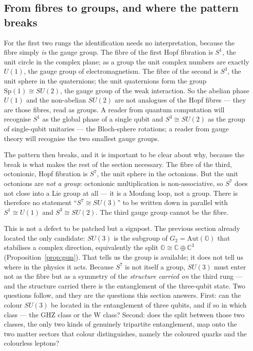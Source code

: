 \subsection{From fibres to groups, and where the pattern breaks}

For the first two rungs the identification needs no interpretation, because the fibre simply
\emph{is} the gauge group. The fibre of the first Hopf fibration is $S^1$, the unit circle in the
complex plane; as a group the unit complex numbers are exactly $U(1)$, the gauge group of
electromagnetism. The fibre of the second is $S^3$, the unit sphere in the quaternions; the unit
quaternions form the group $\mathrm{Sp}(1) \cong SU(2)$, the gauge group of the weak interaction.
So the abelian phase $U(1)$ and the non-abelian $SU(2)$ are not analogues of the Hopf fibres --- they
are those fibres, read as groups. A reader from quantum computation will recognise $S^1$ as the
global phase of a single qubit and $S^3 \cong SU(2)$ as the group of single-qubit unitaries --- the
Bloch-sphere rotations; a reader from gauge theory will recognise the two smallest gauge groups.

The pattern then breaks, and it is important to be clear about why, because the break is what makes
the rest of the section necessary. The fibre of the third, octonionic, Hopf fibration is $S^7$, the
unit sphere in the octonions. But the unit octonions are \emph{not a group}: octonionic
multiplication is non-associative, so $S^7$ does not close into a Lie group at all --- it is a
Moufang loop, not a group. There is therefore no statement ``$S^7 \cong SU(3)$'' to be written down
in parallel with $S^1 \cong U(1)$ and $S^3 \cong SU(2)$. The third gauge group cannot be the fibre.

This is not a defect to be patched but a signpost. The previous section already located the only
candidate: $SU(3)$ is the subgroup of $G_2 = \mathrm{Aut}(\mathbb{O})$ that stabilises a complex
direction, equivalently the split $\mathbb{O} \cong \mathbb{C} \oplus \mathbb{C}^3$
(Proposition~\ref{prop:gsm}). That tells us the group is available; it does not tell us where in the
physics it acts. Because $S^7$ is not itself a group, $SU(3)$ must enter not as the fibre but as a
symmetry of the \emph{structure carried on} the third rung --- and the structure carried there is the
entanglement of the three-qubit state. Two questions follow, and they are the questions this section
answers. First: can the colour $SU(3)$ be located in the entanglement of three qubits, and if so in
which class --- the GHZ class or the W class? Second: does the split between those two classes, the
only two kinds of genuinely tripartite entanglement, map onto the two matter sectors that colour
distinguishes, namely the coloured quarks and the colourless leptons?

